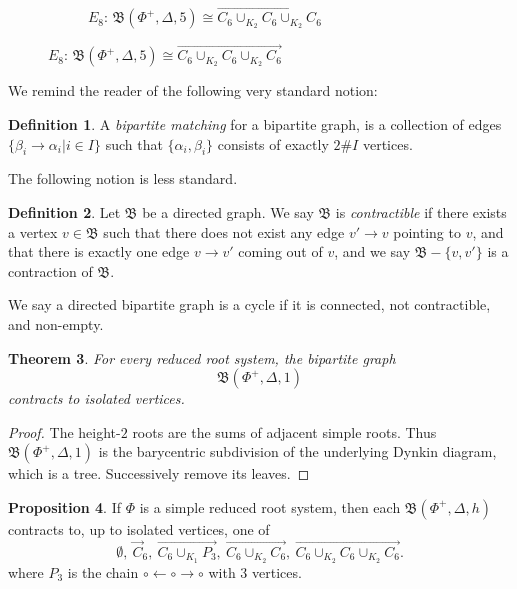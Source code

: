 \documentclass[11pt]{amsart}
\newtheorem{thm}{Theorem}[section]
\theoremstyle{definition}
\newtheorem{prop}[thm]{Proposition}
\newtheorem{defn}[thm]{Definition}
\newcommand{\fB}{\mathfrak{B}}
\begin{document}
\begin{figure}[H]
\centering
\begin{subfigure}{.8\textwidth}
\centering
\setcounter{subfigure}{2}
\tikzEEightFive
\caption{$E_8$: $\fB(\Phi^+, \Delta, 5)\cong \overrightarrow{C_6 \cup_{K_2} C_6 \cup_{K_2} C_6}$}
\label{figure:E8, layer 5}
\end{subfigure}
\end{figure}

We remind the reader of the following very standard notion:

\begin{defn}
A {\it bipartite matching} for a bipartite graph,
is a collection of edges $\{\beta_i\to \alpha_i|i\in I\}$
such that $\{\alpha_i, \beta_i\}$
consists of exactly $2\#I$ vertices.
\end{defn}

The following notion is less standard.

\begin{defn}
Let $\fB$ be a directed graph.
We say $\fB$ is {\it contractible}
if there exists a vertex $v\in \fB$
such that there does not exist any edge $v'\to v$ pointing
to $v$,
and that there is exactly one edge
$v\to v'$ coming out of $v$,
and we say
$\fB-\{v, v'\}$ is a contraction of $\fB$.

We say a directed bipartite graph is a cycle
if it is connected, not contractible,
and non-empty.
\end{defn}

\begin{thm}
For every reduced root system, the bipartite graph
\[
\fB(\Phi^+,\Delta,1)
\]
contracts to isolated vertices.
\label{thm:height-two-contractible}
\end{thm}

\begin{proof}
The height-$2$ roots are the sums of adjacent simple roots. Thus
$\fB(\Phi^+,\Delta,1)$ is the barycentric subdivision of the underlying
Dynkin diagram, which is a tree. Successively remove its leaves.
\end{proof}

\begin{prop}
If $\Phi$ is a simple reduced root system,
then each $\fB(\Phi^+, \Delta, h)$
contracts to, up to isolated vertices, one of
\[
\emptyset,~ \vec C_6,~
\overrightarrow{C_6 \cup_{K_1}P_3},~
\overrightarrow{C_6 \cup_{K_2} C_6},~
\overrightarrow{C_6 \cup_{K_2} C_6 \cup_{K_2} C_6}.
\]
where $P_3$ is the chain
$\circ\leftarrow \circ \to \circ$
with $3$ vertices.
\label{prop:perfect-match}
\end{prop}
\end{document}
